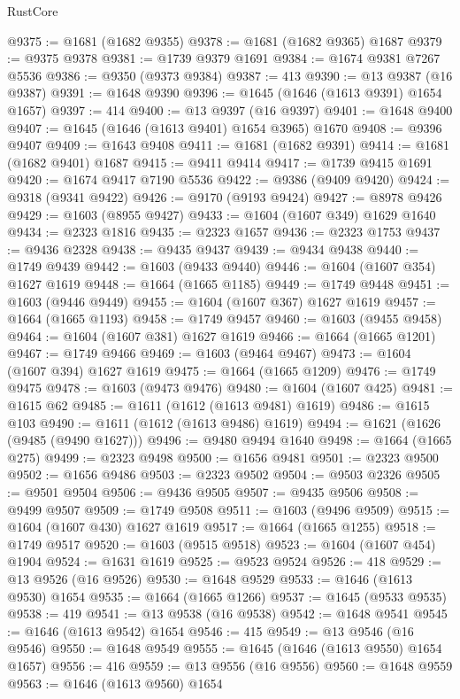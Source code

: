 \begin{lexlean}{RustCore}
\begin{coremodule}
@9375 := @1681 (@1682 @9355)
@9378 := @1681 (@1682 @9365) @1687
@9379 := @9375 @9378
@9381 := @1739 @9379 @1691
@9384 := @1674 @9381 @7267 @5536
@9386 := @9350 (@9373 @9384)
@9387 := 413
@9390 := @13 @9387 (@16 @9387)
@9391 := @1648 @9390
@9396 := @1645 (@1646 (@1613 @9391) @1654 @1657)
@9397 := 414
@9400 := @13 @9397 (@16 @9397)
@9401 := @1648 @9400
@9407 := @1645 (@1646 (@1613 @9401) @1654 @3965) @1670
@9408 := @9396 @9407
@9409 := @1643 @9408
@9411 := @1681 (@1682 @9391)
@9414 := @1681 (@1682 @9401) @1687
@9415 := @9411 @9414
@9417 := @1739 @9415 @1691
@9420 := @1674 @9417 @7190 @5536
@9422 := @9386 (@9409 @9420)
@9424 := @9318 (@9341 @9422)
@9426 := @9170 (@9193 @9424)
@9427 := @8978 @9426
@9429 := @1603 (@8955 @9427)
@9433 := @1604 (@1607 @349) @1629 @1640
@9434 := @2323 @1816
@9435 := @2323 @1657
@9436 := @2323 @1753
@9437 := @9436 @2328
@9438 := @9435 @9437
@9439 := @9434 @9438
@9440 := @1749 @9439
@9442 := @1603 (@9433 @9440)
@9446 := @1604 (@1607 @354) @1627 @1619
@9448 := @1664 (@1665 @1185)
@9449 := @1749 @9448
@9451 := @1603 (@9446 @9449)
@9455 := @1604 (@1607 @367) @1627 @1619
@9457 := @1664 (@1665 @1193)
@9458 := @1749 @9457
@9460 := @1603 (@9455 @9458)
@9464 := @1604 (@1607 @381) @1627 @1619
@9466 := @1664 (@1665 @1201)
@9467 := @1749 @9466
@9469 := @1603 (@9464 @9467)
@9473 := @1604 (@1607 @394) @1627 @1619
@9475 := @1664 (@1665 @1209)
@9476 := @1749 @9475
@9478 := @1603 (@9473 @9476)
@9480 := @1604 (@1607 @425)
@9481 := @1615 @62
@9485 := @1611 (@1612 (@1613 @9481) @1619)
@9486 := @1615 @103
@9490 := @1611 (@1612 (@1613 @9486) @1619)
@9494 := @1621 (@1626 (@9485 (@9490 @1627)))
@9496 := @9480 @9494 @1640
@9498 := @1664 (@1665 @275)
@9499 := @2323 @9498
@9500 := @1656 @9481
@9501 := @2323 @9500
@9502 := @1656 @9486
@9503 := @2323 @9502
@9504 := @9503 @2326
@9505 := @9501 @9504
@9506 := @9436 @9505
@9507 := @9435 @9506
@9508 := @9499 @9507
@9509 := @1749 @9508
@9511 := @1603 (@9496 @9509)
@9515 := @1604 (@1607 @430) @1627 @1619
@9517 := @1664 (@1665 @1255)
@9518 := @1749 @9517
@9520 := @1603 (@9515 @9518)
@9523 := @1604 (@1607 @454) @1904
@9524 := @1631 @1619
@9525 := @9523 @9524
@9526 := 418
@9529 := @13 @9526 (@16 @9526)
@9530 := @1648 @9529
@9533 := @1646 (@1613 @9530) @1654
@9535 := @1664 (@1665 @1266)
@9537 := @1645 (@9533 @9535)
@9538 := 419
@9541 := @13 @9538 (@16 @9538)
@9542 := @1648 @9541
@9545 := @1646 (@1613 @9542) @1654
@9546 := 415
@9549 := @13 @9546 (@16 @9546)
@9550 := @1648 @9549
@9555 := @1645 (@1646 (@1613 @9550) @1654 @1657)
@9556 := 416
@9559 := @13 @9556 (@16 @9556)
@9560 := @1648 @9559
@9563 := @1646 (@1613 @9560) @1654

\end{coremodule}
\end{lexlean}

